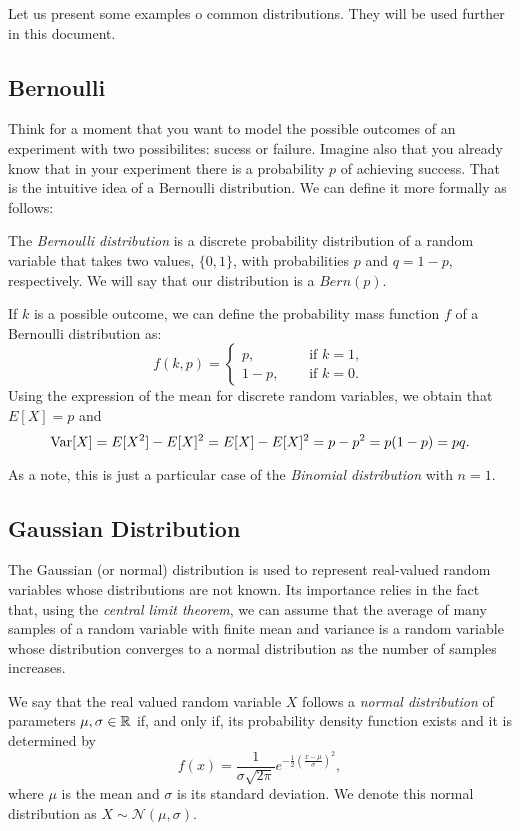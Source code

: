 Let us present some examples o common distributions. They will be used further in this document.

\subsection*{Bernoulli}

Think for a moment that you want to model the possible outcomes of an experiment with two possibilites: sucess or failure. Imagine also that you already know that in your experiment there is a probability $p$ of 
achieving success. That is the intuitive idea of a Bernoulli distribution. We can define it more formally as follows: 

The \emph{Bernoulli distribution} is a discrete probability distribution of a random variable that takes two values, $\{0,1\}$, with probabilities $p$ and $q = 1-p$, respectively. We will say that our distribution is a $Bern(p)$.

If $k$ is a possible outcome, we can define
the probability mass function $f$ of a Bernoulli distribution as:
$$
f(k,p) = 
\begin{cases} 
p, \quad & \text{ if } k=1,\\
1-p, \quad & \text{ if } k = 0.
\end{cases}
$$
Using the expression of the mean for discrete random variables, we obtain that $E[X] = p$ and 
$$
\operatorname*{Var}[X] = E[X^2] - E[X]^2 = E[X] - E[X]^2 = p-p^2 = p(1-p) = pq.
$$

As a note, this is just a particular case of the \emph{Binomial distribution} with $n=1$.

\subsection*{Gaussian Distribution}

The Gaussian (or normal) distribution is used to represent real-valued random variables whose distributions are not known.
Its importance relies in the fact that, using the \emph{central limit theorem}, we can assume that the average of many samples of
a random variable with finite mean and variance is a random variable whose distribution converges to a normal distribution as the number of samples increases.

\begin{ndef}
We say that the real valued random variable $X$ follows a \emph{normal distribution} of parameters $\mu,\sigma\in \mathbb{R}$ if, and only if,
its probability density function exists and it is determined by
\[
f(x) = \frac{1}{\sigma \sqrt{2\pi}}e^{-\frac{1}{2}\left( \frac{x - \mu}{\sigma}\right)^2},
\]
where $\mu$ is the mean and $\sigma$ is its standard deviation. We denote this normal distribution as $X \sim \mathcal N (\mu,\sigma)$.
\end{ndef}


